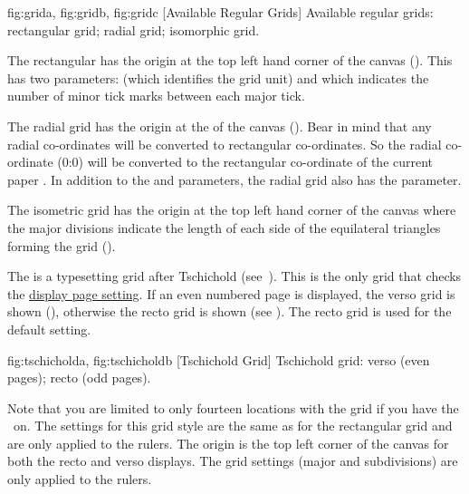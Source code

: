 {
  {fig:grida}{}{},
  {fig:gridb}{}{},
  {fig:gridc}{}{}
}
[Available Regular Grids]
{Available regular grids:
 rectangular grid;
 radial grid;
 isomorphic grid.}


The rectangular has the origin at the top left hand corner of the \gls{canvas}
(). This has two parameters: 
(which identifies the grid unit) and 
which indicates the number of minor tick marks between each major
tick.


The radial grid has the origin at the  of the
\gls{canvas} (). Bear in mind that any
radial co-ordinates will be converted to rectangular co-ordinates.
So the radial co-ordinate (0:0) will be converted to the rectangular
co-ordinate of the current paper .
In addition to the  and
 parameters, the radial grid also has 
the  parameter.


The isometric grid has the origin at the top left hand corner of the
\gls{canvas} where the major divisions indicate the length of each
side of the equilateral triangles forming the grid
().


The  is a typesetting grid after Tschichold
(see~\cite[p.~40]{Hoschuli}). This is the only grid that checks the
\hyperref[sec:displaypage]{display page setting}. If an even
numbered page is displayed, the \gls{verso} grid is shown
(), otherwise the \gls{recto} grid is
shown (see ). The \gls*{recto} grid is
used for the default  setting.

{
  {fig:tschicholda}{}{},
  {fig:tschicholdb}{}{}
}
[Tschichold Grid]
{Tschichold grid:
 verso (even pages);
 recto (odd pages).}

Note that you are limited to only fourteen locations with the
 grid if you have the
\gridlock\ on. The settings for this grid style are the same as for
the rectangular grid and are only applied to the rulers. The origin
is the top left corner of the \gls{canvas} for both the \gls{recto}
and \gls{verso} displays. The grid settings (major and subdivisions)
are only applied to the rulers.

